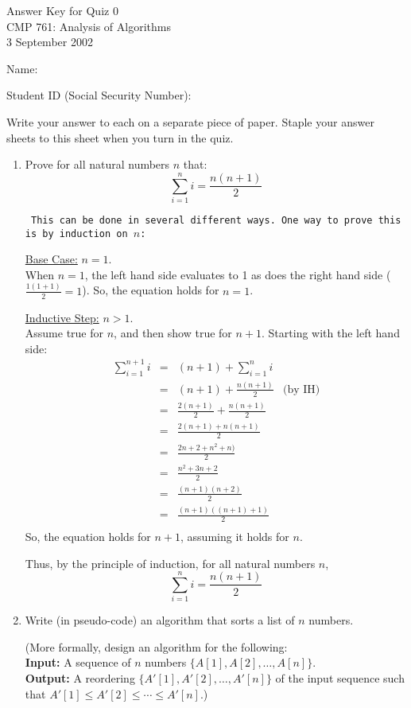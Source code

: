 \documentclass[11pt]{article}
\begin{document}
\begin{center}
	{Answer Key for Quiz 0}\\
	{CMP 761: Analysis of Algorithms}\\
	{3 September 2002}
\end{center}



Name: \underline{\hspace{ 3 in}}

Student ID (Social Security Number): \underline{\hspace{1in}}

\bigskip
Write your answer to each on a separate piece of paper.  Staple your
answer sheets to this sheet when you turn in the quiz.
\bigskip
\begin{enumerate}
  \item Prove for all natural numbers $n$ that:
	\[
		\sum_{i=1}^{n} i = \frac{n(n+1)}{2}
	\]
\bigskip
{\tt
  This can be done in several different ways.  One way to prove this is by 
  induction on $n$:

  \underline{Base Case:} $n=1$.\\
     When $n =1$, the left hand side 
     evaluates to 1 as does the right hand side ($\frac{1(1+1)}{2} = 1$).
     So, the equation holds for $n=1$.

  \underline{Inductive Step:} $n > 1$.\\
     Assume true for $n$, and then show true for $n+1$.
     Starting with the left hand side:
	$$
	\begin{array}{rcll}
		\sum_{i=1}^{n+1} i & = & (n+1) + \sum_{i=1}^{n} i &\\
			& = & (n+1)  + \frac{n(n+1)}{2} & \mbox{(by IH)}\\
			& = & \frac{2(n+1)}{2} + \frac{n(n+1)}{2} & \\
			& = & \frac{2(n+1)+n(n+1)}{2} & \\
			& = & \frac{2n+2+n^2+n)}{2} & \\
			& = & \frac{n^2 + 3n + 2}{2} & \\
			& = & \frac{(n+1)(n+2)}{2} & \\
			& = & \frac{(n+1)((n+1)+1)}{2} & \\
	\end{array}
	$$
  So, the equation holds for $n+1$, assuming it holds for $n$.

  Thus, by the principle of induction, for all natural numbers $n$,
	\[
		\sum_{i=1}^{n} i = \frac{n(n+1)}{2}
	\]
}

\bigskip
	
  \item Write (in pseudo-code) an algorithm that sorts a list of $n$
	numbers.
	
	\bigskip
	(More formally, design an algorithm for the following:\\
	{\bf Input:} A sequence of $n$ numbers $\{A[1],A[2],\ldots,A[n]\}$.\\
	{\bf Output:} A reordering $\{A'[1],A'[2],\ldots,A'[n]\}$
		of the input sequence such that
		$A'[1] \leq A'[2] \leq \cdots \leq A'[n]$.)
\end{enumerate}
\end{document}
